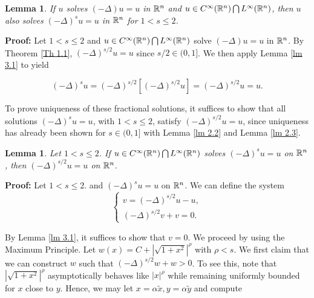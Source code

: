 \documentclass{article}
\newtheorem{lemma}[theorem]{Lemma}
\begin{document}


\begin{lemma}
\label{lm 3.2}
If $u$ solves $(-\Delta) u = u $ in $\mathbb{R}^n$ and $u \in C^\infty(\mathbb{R}^n) \bigcap L^\infty(\mathbb{R}^n)$, then $u$ also solves  $(-\Delta)^s u = u$ in $\mathbb{R}^n$ for $1<s\le2$.
\end{lemma}

\noindent
\textbf{Proof:}
Let $1<s \le 2$ and $u \in C^\infty(\mathbb{R}^n) \bigcap L^\infty(\mathbb{R}^n)$ solve $(-\Delta) u = u $ in $\mathbb{R}^n$. By Theorem \ref{Th 1.1}, $(-\Delta)^{s/2} u = u$ since $s/2 \in (0,1]$. We then apply Lemma \ref{lm 3.1} to yield

\begin{equation}
    (-\Delta)^s u = (-\Delta)^{s/2}[(-\Delta)^{s/2}u] = (-\Delta)^{s/2}u = u.
    \tag{3.4} \label{eq: 3.4}
\end{equation} \qedsymbol


To prove uniqueness of these fractional solutions, it suffices to show that all solutions $(-\Delta)^s u = u$, with $1<s \le 2$, satisfy $(-\Delta)^{s/2} u = u$, since uniqueness has already been shown for $s \in (0,1]$ with Lemma \ref{lm 2.2} and Lemma \ref{lm 2.3}.

\begin{lemma}
\label{lm 3.3}
Let $1<s\le2$. If $u \in C^\infty(\mathbb{R}^n) \bigcap L^\infty(\mathbb{R}^n)$ solves $(-\Delta)^s u = u$ on $\mathbb{R}^n$, then $(-\Delta)^{s/2} u = u$ on $\mathbb{R}^n$.
\end{lemma}

\noindent
\textbf{Proof:}
Let $1<s\le2$. and $(-\Delta)^s u  = u$ on $\mathbb{R}^n$. We can define the system
\begin{equation}
    \left\{\begin{array}{l}
v=(-\Delta)^{s/2}u-u, \\
(-\Delta)^{s/2}v+v=0.
\end{array}
    \right.
      \tag{3.5} \label{eq: 3.5}
\end{equation}

By Lemma \ref{lm 3.1}, it suffices to show that $v=0$. 
We proceed by using the Maximum Principle. Let $w(x) = C+ |\sqrt{1+x^2}|^\rho$ with $\rho < s$. We first claim that we can construct $w$ such that $(-\Delta)^{s/2}w+w>0$. To see this, note that $ |\sqrt{1+x^2}|^\rho$ asymptotically behaves like $|x|^\rho$  while remaining uniformly bounded for $x$ close to $y$. Hence, we may let $x = \alpha \tilde{x}, y= \alpha \tilde{y}$ and compute
\end{document}
